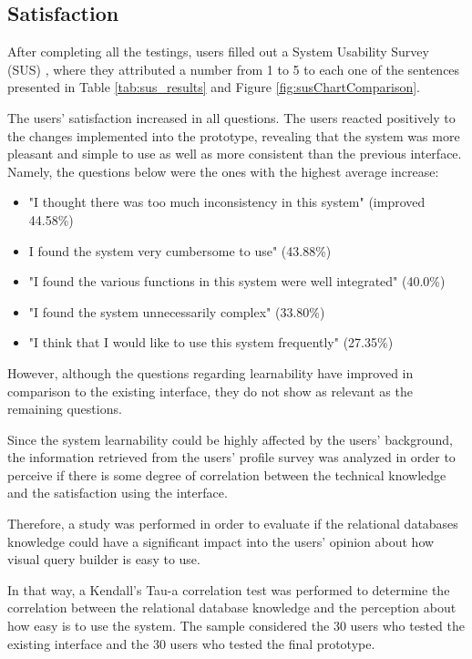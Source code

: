 \subsection{Satisfaction}
\label{subsec:satisfaction}
After completing all the testings, users filled out a System Usability Survey (SUS) \cite{system_usability_scale}, where they attributed a number from 1 to 5 to each one of the sentences presented in Table \ref{tab:sus_results} and Figure \ref{fig:susChartComparison}.

The users' satisfaction increased in all questions. The users reacted positively to the changes implemented into the prototype, revealing that the system was more pleasant and simple to use as well as more consistent than the previous interface. Namely, the questions below were the ones with the highest average increase:

\begin{itemize}
  \item "I thought there was too much inconsistency in this system" (improved 44.58\%)
  \item I found the system very cumbersome to use" (43.88\%)
  \item "I found the various functions in this system were well integrated" (40.0\%)
  \item "I found the system unnecessarily complex" (33.80\%)
  \item "I think that I would like to use this system frequently" (27.35\%) 
\end{itemize}

However, although the questions regarding learnability have improved in comparison to the existing interface, they do not show as relevant as the remaining questions.

Since the system learnability could be highly affected by the users' background, the information retrieved from the users' profile survey was analyzed in order to perceive if there is some degree of correlation between the technical knowledge and the satisfaction using the interface.

Therefore, a study was performed in order to evaluate if the relational databases knowledge could have a significant impact into the users' opinion about how visual query builder is easy to use.

In that way, a Kendall's Tau-a correlation test was performed to determine the correlation between the relational database knowledge and the perception about how easy is to use the system. The sample considered the 30 users who tested the existing interface and the 30 users who tested the final prototype. 

